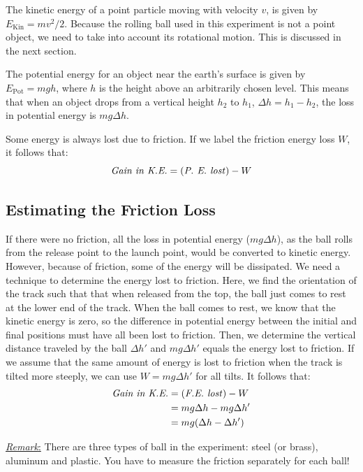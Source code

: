 The kinetic energy of a point particle moving with velocity $v$, is given by $E_{\textrm{Kin}}=mv^2/2$. Because the rolling ball used in this experiment is not a point object, we need to take into account its rotational motion. This is discussed in the next section. \myskip

The potential energy for an object near the earth’s surface is given by $E_{\textrm{Pot}}=mgh$, where $h$ is the height above an arbitrarily chosen level. This means that when an object drops from a vertical height $h_2$ to $h_1$, $\Delta h=h_1-h_2$, the loss in potential energy is $mg\Delta h$.\myskip

Some energy is always lost due to friction. If we label the friction energy loss $W$, it follows that: 
\begin{equation}
\textrm{\emph{Gain in K.E.}} = (\textrm{\emph{P. E. lost}}) - W  
\end{equation}

\subsection{Estimating the Friction Loss}

If there were no friction, all the loss in potential energy ($mg\Delta h$), as the ball rolls from the release point to the launch point, would be converted to kinetic energy. However, because of friction, some of the energy will be dissipated. We need a technique to determine the energy lost to friction. Here, we find the orientation of the track such that that when released from the top, the ball just comes to rest at the lower end of the track. When the ball comes to rest, we know that the kinetic energy is zero, so the difference in potential energy between the initial and final positions must have all been lost to friction. Then, we determine the vertical distance traveled by the ball $\Delta h'$ and $mg\Delta h'$ equals the energy lost to friction. If we assume that the same amount of energy is lost to friction when the track is tilted more steeply, we can use $W=mg\Delta h'$ for all tilts. It follows that:
\begin{align}
  \textrm{\emph{Gain in K.E.}}&=(\textrm{\emph{F.E. lost}})-W\\
  &=mg\Delta h-mg\Delta h'\\
  &=mg(\Delta h-\Delta h')
\end{align}

\underline{\emph{Remark}:} There are three types of ball in the experiment: steel (or brass), aluminum and plastic. You have to measure the friction separately for each ball!

